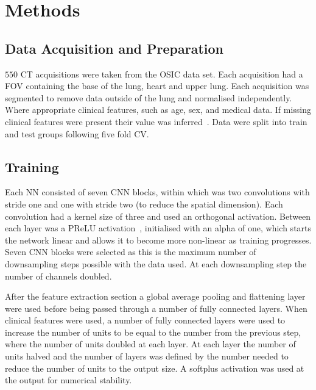 
\section{Methods} \label{sec:methods}
    \subsection{Data Acquisition and Preparation} \label{sec:data_acquisition_and_preparation}
        $550$ \gls{CT} acquisitions were taken from the \gls{OSIC} data set. Each acquisition had a \gls{FOV} containing the base of the lung, heart and upper lung. Each acquisition was segmented to remove data outside of the lung and normalised independently. Where appropriate clinical features, such as age, sex, and medical data. If missing clinical features were present their value was inferred~\cite{Shahin2022SurvivalData}. Data were split into train and test groups following five fold \gls{CV}.

    \subsection{Training} \label{sec:training}
        Each \gls{NN} consisted of seven \gls{CNN} blocks, within which was two convolutions with stride one and one with stride two (to reduce the spatial dimension). Each convolution had a kernel size of three and used an orthogonal activation. Between each layer was a \gls{PReLU} activation~\cite{He2015DelvingClassification}, initialised with an alpha of one, which starts the network linear and allows it to become more non-linear as training progresses. Seven \gls{CNN} blocks were selected as this is the maximum number of downsampling steps possible with the data used. At each downsampling step the number of channels doubled.

        After the feature extraction section a global average pooling and flattening layer were used before being passed through a number of fully connected layers. When clinical features were used, a number of fully connected layers were used to increase the number of units to be equal to the number from the previous step, where the number of units doubled at each layer. At each layer the number of units halved and the number of layers was defined by the number needed to reduce the number of units to the output size. A softplus activation was used at the output for numerical stability.

